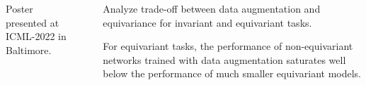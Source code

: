 \documentclass[
                20pt,
                final,
                hyperref={%
                    breaklinks=true,%
                    letterpaper=true,%
                    bookmarks=false%
                }]{beamer}
\newlength{\sepwid}
\newlength{\onecolwid}
\newlength{\twocolwid}
\newlength{\midwid}
\begin{document}
\begin{frame}[t]
\begin{columns}[t]
\begin{column}{\onecolwid}
                \vfill
                \noindent\footnotesize{Poster presented at ICML-2022 in Baltimore.}
            \end{column}

            \begin{column}{\sepwid}
            \end{column}


            \begin{column}{\twocolwid}
                \vspace{-.6in}


                \begin{alertblock}{\huge{}}
                    \centering\LARGE
                    Analyze trade-off between data augmentation and equivariance for invariant and equivariant tasks.
                \end{alertblock}
                \medskip
                \begin{alertblock}{\huge{}}
                    \centering
                    \setlength{\columnsep}{60pt}
                    \begin{multicols}{2}
                        For equivariant tasks, the performance of non-equivariant networks trained with data augmentation saturates well below the performance of much smaller equivariant models.


\end{multicols}
\end{alertblock}
\end{column}
\end{columns}
\end{frame}
\end{document}
